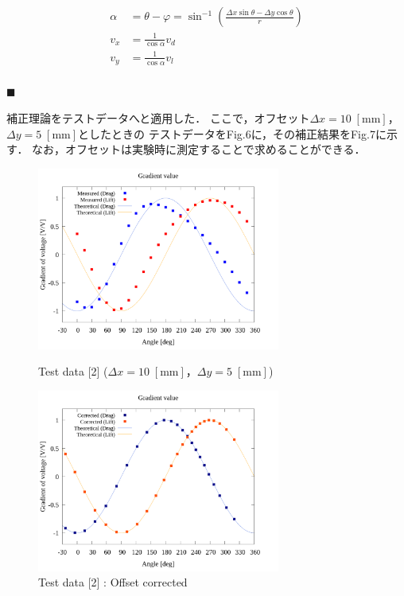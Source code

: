 \documentclass[twocolumn,a4j]{jsarticle}
\begin{document}
\begin{align*}
    \alpha  & = \theta - \varphi = \sin^{-1} \left( \frac{\Delta x \sin \theta - \Delta y \cos \theta}{r} \right)       \\
    v_{x}   & = \frac{1}{\cos \alpha} v_d \\
    v_{y}   & = \frac{1}{\cos \alpha} v_l \\
\end{align*}

\noindent $\blacksquare$ 

補正理論をテストデータへと適用した．
ここで，オフセット$\Delta x = 10\;\mathrm{[mm]}$，$\Delta y = 5\;\mathrm{[mm]}$としたときの
テストデータをFig.6に，その補正結果をFig.7に示す．
なお，オフセットは実験時に測定することで求めることができる．

\begin{figure}[htbp]
    \begin{center}
        \includegraphics[width=80mm]{../../../02_workspace/result/offset_dx=10.0_dy=5.0/plot/20/20_adjust-value.png}
        \caption{Test data [2] ($\Delta x = 10\;\mathrm{[mm]}$，$\Delta y = 5\;\mathrm{[mm]}$)}
        \includegraphics[width=80mm]{../../../02_workspace/result/offset_dx=10.0_dy=5.0/plot/21/21-2_summary_offset.png}
        \caption{Test data [2] : Offset corrected}
    \end{center}
\end{figure}
\end{document}
